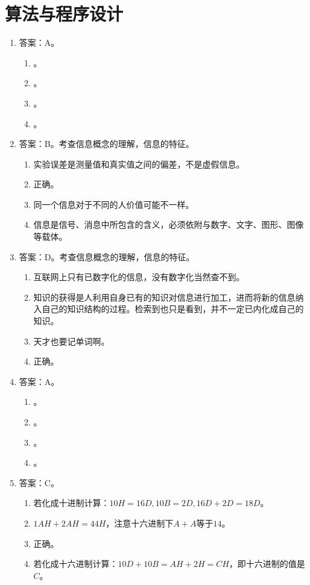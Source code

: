 \section{算法与程序设计}

\begin{enumerate}
\item 答案：A。
	\begin{enumerate}[label=\Alph*.]
	\item 。
	\item 。
	\item 。
	\item 。
	\end{enumerate}

\item 答案：B。考查信息概念的理解，信息的特征。
	\begin{enumerate}[label=\Alph*.]
	\item 实验误差是测量值和真实值之间的偏差，不是虚假信息。
	\item 正确。
	\item 同一个信息对于不同的人价值可能不一样。
	\item 信息是信号、消息中所包含的含义，必须依附与数字、文字、图形、图像等载体。
	\end{enumerate}

\item 答案：D。考查信息概念的理解，信息的特征。
	\begin{enumerate}[label=\Alph*.]
	\item 互联网上只有已数字化的信息，没有数字化当然查不到。
	\item 知识的获得是人利用自身已有的知识对信息进行加工，进而将新的信息纳入自己的知识结构的过程。检索到也只是看到，并不一定已内化成自己的知识。
	\item 天才也要记单词啊。
	\item 正确。
	\end{enumerate}

\item 答案：A。
	\begin{enumerate}[label=\Alph*.]
	\item 。
	\item 。
	\item 。
	\item 。
	\end{enumerate}

\item 答案：C。
	\begin{enumerate}[label=\Alph*.]
	\item 若化成十进制计算：$10H=16D, 10B = 2D, 16D+2D=18D$。
	\item $1AH + 2AH = 44H$，注意十六进制下$A + A$等于$14$。
	\item 正确。
	\item 若化成十六进制计算：$10D + 10B = AH + 2H = CH$，即十六进制的值是$C$。
	\end{enumerate}


\end{enumerate}
